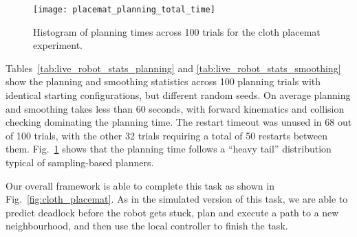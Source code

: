 \begin{figure}
    \centering
    \texttt{[image: placemat\_planning\_total\_time]}
    \caption{Histogram of planning times across 100 trials for the cloth placemat experiment.}
    \label{fig:placemat_planning_time}
\end{figure}



Tables~\ref{tab:live_robot_stats_planning} and \ref{tab:live_robot_stats_smoothing} show the planning and smoothing statistics across 100 planning trials with identical starting configurations, but different random seeds. On average planning and smoothing takes less than 60 seconds, with forward kinematics and collision checking dominating the planning time. The restart timeout was unused in 68 out of 100 trials, with the other 32 trials requiring a total of 50 restarts between them. Fig.~\ref{fig:placemat_planning_time} shows that the planning time follows a ``heavy tail'' distribution typical of sampling-based planners.

Our overall framework is able to complete this task as shown in Fig.~\ref{fig:cloth_placemat}. As in the simulated version of this task, we are able to predict deadlock before the robot gets stuck, plan and execute a path to a new neighbourhood, and then use the local controller to finish the task.




